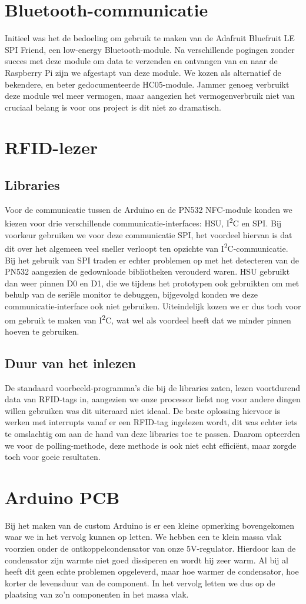 \section{Bluetooth-communicatie}
Initieel was het de bedoeling om gebruik te maken van de Adafruit Bluefruit LE SPI Friend, een low-energy Bluetooth-module. Na verschillende pogingen zonder succes met deze module om data te verzenden en ontvangen van en naar de Raspberry Pi zijn we afgestapt van deze module. We kozen als alternatief de bekendere, en beter gedocumenteerde HC05-module. Jammer genoeg verbruikt deze module wel meer vermogen, maar aangezien het vermogenverbruik niet van cruciaal belang is voor ons project is dit niet zo dramatisch.

\section{RFID-lezer}
\subsection{Libraries}
Voor de communicatie tussen de Arduino en de PN532 NFC-module konden we kiezen voor drie verschillende communicatie-interfaces: HSU, I\textsuperscript{2}C en SPI.
Bij voorkeur gebruiken we voor deze communicatie SPI, het voordeel hiervan is dat dit over het algemeen veel sneller verloopt ten opzichte van I\textsuperscript{2}C-communicatie. Bij het gebruik van SPI traden er echter problemen op met het detecteren van de PN532 aangezien de gedownloade bibliotheken verouderd waren.
HSU gebruikt dan weer pinnen D0 en D1, die we tijdens het prototypen ook gebruikten om met behulp van de seri\"ele monitor te debuggen, bijgevolgd konden we deze communicatie-interface ook niet gebruiken. Uiteindelijk kozen we er dus toch voor om gebruik te maken van I\textsuperscript{2}C, wat wel als voordeel heeft dat we minder pinnen hoeven te gebruiken.
\subsection{Duur van het inlezen}
De standaard voorbeeld-programma's die bij de libraries zaten, lezen voortdurend data van RFID-tags in, aangezien we onze processor liefst nog voor andere dingen willen gebruiken was dit uiteraard niet ideaal. De beste oplossing hiervoor is werken met interrupts vanaf er een RFID-tag ingelezen wordt, dit was echter iets te omslachtig om aan de hand van deze libraries toe te passen. Daarom opteerden we voor de polling-methode, deze methode is ook niet echt effici\"ent, maar zorgde toch voor goeie resultaten. 

\section{Arduino PCB}
Bij het maken van de custom Arduino is er een kleine opmerking bovengekomen waar we in het vervolg kunnen op letten. We hebben een te klein massa vlak voorzien onder de ontkoppelcondensator van onze 5V-regulator. Hierdoor kan de condensator zijn warmte niet goed dissiperen en wordt hij zeer warm. Al bij al heeft dit geen echte problemen opgeleverd, maar hoe warmer de condensator, hoe korter de levensduur van de component. In het vervolg letten we dus op de plaatsing van zo'n componenten in het massa vlak.